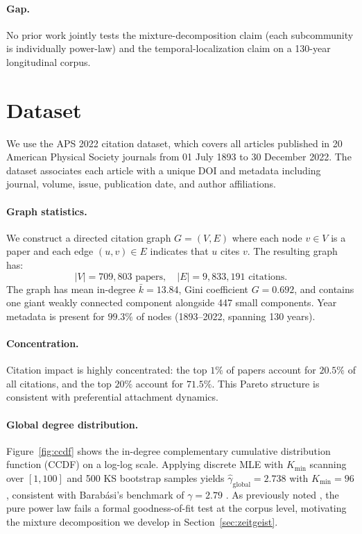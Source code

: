 \documentclass[runningheads]{llncs}
\begin{document}
\paragraph{Gap.}
No prior work jointly tests the mixture-decomposition claim
(each subcommunity is individually power-law) and the temporal-localization
claim on a 130-year longitudinal corpus.


\section{Dataset}
\label{sec:data}

We use the APS 2022 citation dataset, which covers all articles published in
20 American Physical Society journals from 01 July 1893 to 30 December 2022.
The dataset associates each article with a unique DOI and metadata including
journal, volume, issue, publication date, and author affiliations.

\paragraph{Graph statistics.}
We construct a directed citation graph $G = (V, E)$ where each node
$v \in V$ is a paper and each edge $(u, v) \in E$ indicates that $u$ cites $v$.
The resulting graph has:
\[
  |V| = 709{,}803 \text{ papers}, \quad
  |E| = 9{,}833{,}191 \text{ citations}.
\]
The graph has mean in-degree $\bar{k} = 13.84$, Gini coefficient $G = 0.692$,
and contains one giant weakly connected component alongside 447 small
components.  Year metadata is present for $99.3\%$ of nodes
(1893--2022, spanning 130 years).

\paragraph{Concentration.}
Citation impact is highly concentrated: the top $1\%$ of papers account for
$20.5\%$ of all citations, and the top $20\%$ account for $71.5\%$.  This Pareto
structure is consistent with preferential attachment dynamics.

\paragraph{Global degree distribution.}
Figure~\ref{fig:ccdf} shows the in-degree complementary cumulative distribution
function (CCDF) on a log-log scale.  Applying discrete MLE with $K_{\min}$
scanning over $[1, 100]$ and 500 KS bootstrap samples \cite{Clauset2009}
yields $\hat{\gamma}_{\text{global}} = 2.738$ with $K_{\min} = 96$, consistent
with Barab{\'a}si's benchmark of $\gamma = 2.79$ \cite{Barabasi2016}.  As
previously noted \cite{Barabasi2016}, the pure power law fails a formal
goodness-of-fit test at the corpus level, motivating the mixture decomposition
we develop in Section~\ref{sec:zeitgeist}.
\end{document}
